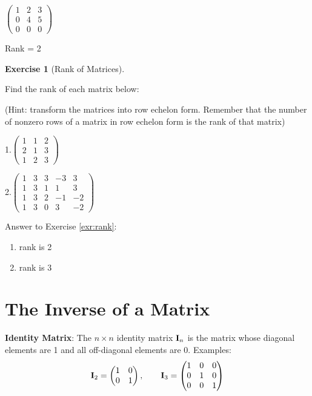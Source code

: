 \documentclass[
]{book}
\theoremstyle{definition}
\theoremstyle{definition}
\theoremstyle{definition}
\newtheorem{exercise}{Exercise}[chapter]
\theoremstyle{remark}
\begin{document}
\(\begin{pmatrix} 1 & 2 & 3 \\ 0 & 4 & 5 \\ 0 & 0 & 0 \end{pmatrix}\)

Rank = 2

\begin{exercise}[Rank of Matrices]
\protect\hypertarget{exr:rank}{}{\label{exr:rank} {} }

Find the rank of each matrix below:

(Hint: transform the matrices into row echelon form. Remember that the number of nonzero rows of a matrix in row echelon form is the rank of that matrix)

1.\(\begin{pmatrix} 1 & 1 & 2 \\ 2 & 1 & 3 \\ 1 & 2 & 3 \end{pmatrix}\)

\bigskip

2.\(\begin{pmatrix} 1 & 3 & 3 & -3 & 3\\ 1 & 3 & 1 & 1 & 3 \\ 1 & 3 & 2 & -1 & -2 \\ 1 & 3 & 0 & 3 & -2 \end{pmatrix}\)
\end{exercise}

Answer to Exercise \ref{exr:rank}:

\begin{enumerate}
\def\labelenumi{\arabic{enumi}.}
\item
  rank is 2
\item
  rank is 3
\end{enumerate}

\hypertarget{the-inverse-of-a-matrix}{%
\section{The Inverse of a Matrix}\label{the-inverse-of-a-matrix}}

\textbf{Identity Matrix}: The \(n\times n\) identity matrix \({\bf I}_n\) is the matrix whose diagonal elements are 1 and all off-diagonal elements are 0. Examples:
\[ {\bf I}_2=\begin{pmatrix} 1&0\\0&1 \end{pmatrix}, \qquad {\bf I}_3=\begin{pmatrix} 1&0&0\\ 0&1&0\\ 
            0&0&1 \end{pmatrix}\]
\end{document}
